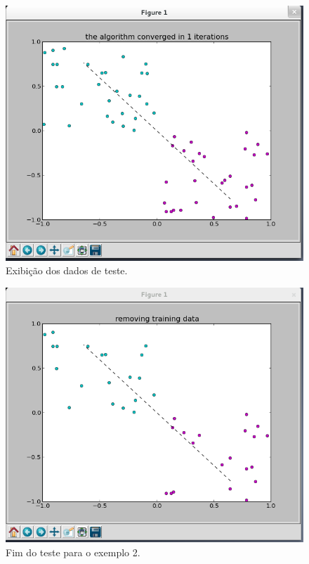\documentclass[brazil, a4paper]{article}
\begin{document}
\begin{description}
\newpage

\begin{figure}[!htb]
\centering
\includegraphics[scale=0.42]{ex3-3.png}
\caption{Exibição dos dados de teste.}
\end{figure}

\begin{figure}[!htb]
\centering
\includegraphics[scale=0.42]{ex3-4.png}
\caption{Fim do teste para o exemplo 2.}
\end{figure}


\end{description}
\end{document}
